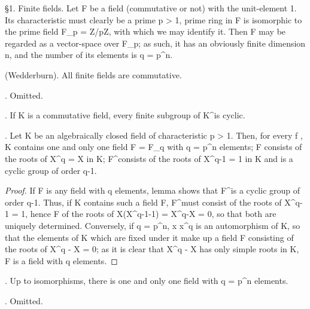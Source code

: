 
  \S 1. Finite fields. Let F be a field (commutative or not) with the
unit-element 1. Its characteristic must clearly be a prime p > 1, 
prime ring in F is isomorphic to the prime field \mathbf F_p = \mathbf Z/p\mathbf Z, with 
which we may identify it. Then F may be regarded as a vector-space over \mathbf F_p;  
as such, it has an obviously finite dimension n, and the number of its 
elements is q = p^n. 

\theorem (Wedderburn). All finite fields are commutative. 

\proof. Omitted.

\lemma. If K is a commutative field, every finite subgroup of K^\times is cyclic.

\theorem. Let K be an algebraically closed field of characteristic p > 1. 
Then, for every f , K contains one and only one field F = F_q with 
q = p^n elements; F consists of the roots of X^q = X in K; F^\times consists 
of the roots of X^{q-1} = 1 in K and is a cyclic group of order q-1. 

\begin{proof}
  If F is any field with q elements, lemma shows that F^\times is a cyclic 
group of order q-1. Thus, if K contains such a field F, F^\times must consist 
of the roots of X^{q-1} = 1, hence F of the roots of X(X^{q-1}-1) = X^q-X = 0, 
so that both are uniquely determined. 
  Conversely, if q = p^n, x \mapsto x^q is an automorphism of K, 
so that the elements of K which are fixed under it make up a field F 
consisting of the roots of X^q - X = 0; as it is clear that X^q - X 
has only simple roots in K, F is a field with q elements. 
\end{proof}

\corollary. Up to isomorphisms, there is one and only one field with q = p^n elements. 

\proof. Omitted.
